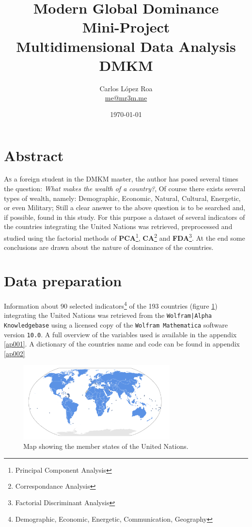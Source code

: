 \documentclass[a4paper,10pt,twocolumn]{article}
\title{Modern Global Dominance\\ \small{Mini-Project}\\\small{Multidimensional Data Analysis}\\\small{DMKM}}
\author{\small{Carlos López Roa}\\\footnotesize{\href{mailto:me@mr3m.me}{me@mr3m.me}}}
\date{\today}
\begin{document}
\maketitle
{}

\section*{Abstract}
\small
\textsc{As} a foreign student in the \textsc{DMKM} master, the author has posed several times the question: \emph{What makes the wealth of a country?}, Of course there exists several types of wealth, namely: Demographic, Economic, Natural, Cultural, Energetic, or even Military; Still a clear answer to the above question is to be searched and, if possible, found in this study. For this purpose a dataset of several indicators of the countries integrating the United Nations was retrieved, preprocessed and studied using the factorial methods of \textbf{PCA}\footnote{Principal Component Analysis}, \textbf{CA}\footnote{Correspondance Analysis} and \textbf{FDA}\footnote{Factorial Discriminant Analysis}. At the end some conclusions are drawn about the nature of dominance of the countries. 
\tableofcontents
\normalsize
\section{Data preparation}
Information about 90 selected indicators\footnote{Demographic, Economic, Energetic, Communication, Geography} of the 193 countries (figure \ref{fun}) integrating the United Nations was retrieved from the \texttt{Wolfram|Alpha Knowledgebase}\cite{Wolfram2016} using a licensed copy of the \texttt{Wolfram Mathematica} software version \texttt{10.0}. A full overview of the variables used is available in the appendix \ref{ap001}. A dictionary of the countries name and code can be found in appendix \ref{ap002}
\begin{figure}[!ht]
\begin{center}
\includegraphics[width=8cm]{UN.pdf}
\caption{\footnotesize{Map showing the member states of the United Nations.}\label{fun}}
\end{center}
\end{figure}
\end{document}
